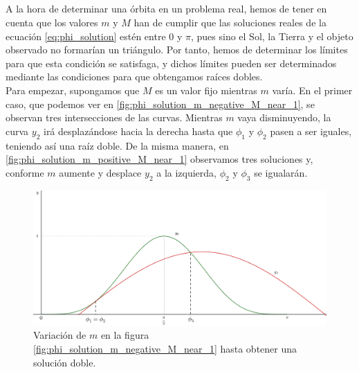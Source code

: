 \documentclass[11pt]{article}
\begin{document}
\subsection{}
\label{subsec:limites_m_M}
A la hora de determinar una órbita en un problema real, hemos de tener en cuenta que los valores $m$ y $M$ han de cumplir que las soluciones reales de la ecuación \eqref{eq:phi_solution} estén entre $0$ y $\pi$, pues sino el Sol, la Tierra y el objeto observado no formarían un triángulo. Por tanto, hemos de determinar los límites para que esta condición se satisfaga, y dichos límites pueden ser determinados mediante las condiciones para que obtengamos raíces dobles.\\

Para empezar, supongamos que $M$ es un valor fijo mientras $m$ varía. En el primer caso, que podemos ver en \ref{fig:phi_solution_m_negative_M_near_1}, se observan tres intersecciones de las curvas. Mientras $m$ vaya disminuyendo, la curva $y_2$ irá desplazándose hacia la derecha hasta que $\phi_1$ y $\phi_2$ pasen a ser iguales, teniendo así una raíz doble. De la misma manera, en \ref{fig:phi_solution_m_positive_M_near_1} observamos tres soluciones y, conforme $m$ aumente y desplace $y_2$ a la izquierda, $\phi_2$ y $\phi_3$ se igualarán.\\

\begin{figure}[H]
\centering
\includegraphics[scale=0.115]{images/minuscula_varia_primer_caso.png}
\caption{Variación de $m$ en la figura \ref{fig:phi_solution_m_negative_M_near_1} hasta obtener una solución doble.}
\label{fig:minuscula_varia_primer_caso}
\end{figure}
\end{document}

